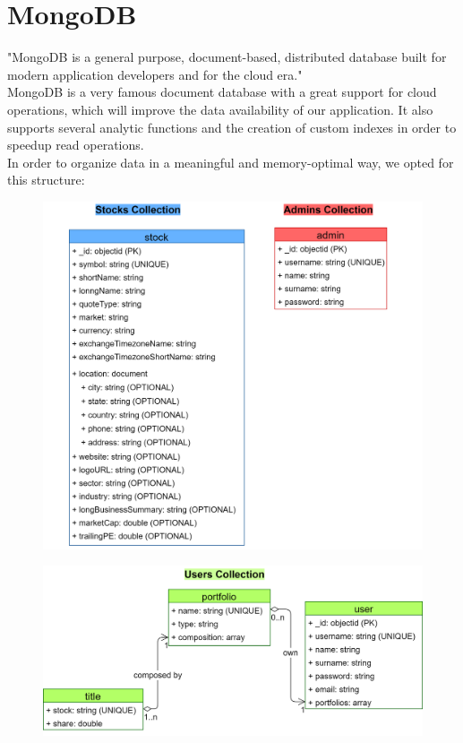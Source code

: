 \section{MongoDB}
"MongoDB is a general purpose, document-based, distributed database built for
modern application developers and for the cloud era."\\
MongoDB is a very famous document database with a great support for cloud
operations, which will improve the data availability of our application. It also
supports several analytic functions and the creation of custom indexes in order
to speedup read operations.\\
In order to organize data in a meaningful and memory-optimal way, we opted for
this structure:
\begin{figure}[H]
    \vspace{0.2cm}
	\begin{center}
		\includegraphics[scale=0.76]{img/mongoDB_schema_1.png}
	\end{center}
\end{figure}
\begin{figure}[H]
	\begin{center}
		\includegraphics[scale=0.8]{img/mongoDB_schema_2.png}
	\end{center}
\end{figure}

